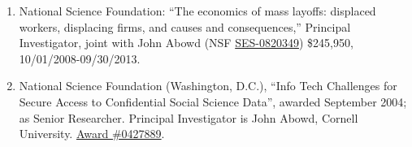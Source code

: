 \documentclass[10pt,letterpaper]{report}
\begin{document}
\begin{enumerate}
	\item National Science Foundation: ``The economics of mass layoffs:
	displaced workers, displacing firms, and causes and consequences,''
	Principal Investigator, joint
	with John Abowd (NSF \href{http://www.nsf.gov/awardsearch/showAward.do?AwardNumber=082034}{SES-0820349}) \$245,950,  10/01/2008-09/30/2013.
	
	\item National Science Foundation (Washington, D.C.),  ``Info
	Tech Challenges for Secure Access to Confidential Social Science Data'',
	awarded September 2004; as Senior Researcher. Principal Investigator is John Abowd, Cornell
	University.   \href{http://www.nsf.gov/awardsearch/showAward.do?AwardNumber=0427889}{Award \#0427889}.
\end{enumerate}

\end{document}
